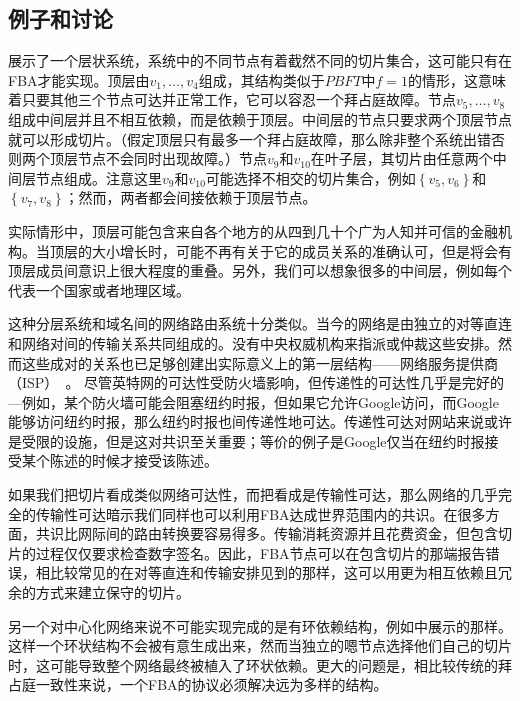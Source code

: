\subsection{例子和讨论}
展示了一个层状系统，系统中的不同节点有着截然不同的切片集合，这可能只有在FBA才能实现。顶层由$v_1,\ldots,v_4$组成，其结构类似于$PBFT$中$f=1$的情形，这意味着只要其他三个节点可达并正常工作，它可以容忍一个拜占庭故障。节点$v_5,\ldots,v_8$组成中间层并且不相互依赖，而是依赖于顶层。中间层的节点只要求两个顶层节点就可以形成切片。（假定顶层只有最多一个拜占庭故障，那么除非整个系统出错否则两个顶层节点不会同时出现故障。）节点$v_9$和$v_10$在叶子层，其切片由任意两个中间层节点组成。注意这里$v_9$和$v_10$可能选择不相交的切片集合，例如$\left\{v_5,v_6\right\}$和$\left\{v_7,v_8\right\}$；然而，两者都会间接依赖于顶层节点。

实际情形中，顶层可能包含来自各个地方的从四到几十个广为人知并可信的金融机构。当顶层的大小增长时，可能不再有关于它的成员关系的准确认可，但是将会有顶层成员间意识上很大程度的重叠。另外，我们可以想象很多的中间层，例如每个代表一个国家或者地理区域。

这种分层系统和域名间的网络路由系统十分类似。当今的网络是由独立的对等直连和网络对间的传输关系共同组成的。没有中央权威机构来指派或仲裁这些安排。然而这些成对的关系也已足够创建出实际意义上的第一层结构——网络服务提供商（ISP）~\cite{peer_isp2010}。	尽管英特网的可达性受防火墙影响，但传递性的可达性几乎是完好的---例如，某个防火墙可能会阻塞纽约时报，但如果它允许Google访问，而Google能够访问纽约时报，那么纽约时报也间传递性地可达。传递性可达对网站来说或许是受限的设施，但是这对共识至关重要；等价的例子是Google仅当在纽约时报接受某个陈述的时候才接受该陈述。

如果我们把{\quorum}切片看成类似网络可达性，而把{\quorum}看成是传输性可达，那么网络的几乎完全的传输性可达暗示我们同样也可以利用FBA达成世界范围内的共识。在很多方面，共识比网际间的路由转换要容易得多。传输消耗资源并且花费资金，但包含切片的过程仅仅要求检查数字签名。因此，FBA节点可以在包含切片的那端报告错误，相比较常见的在对等直连和传输安排见到的那样，这可以用更为相互依赖且冗余的方式来建立保守的切片。

另一个对中心化网络来说不可能实现完成的是有环依赖结构，例如中展示的那样。这样一个环状结构不会被有意生成出来，然而当独立的嗯节点选择他们自己的切片时，这可能导致整个网络最终被植入了环状依赖。更大的问题是，相比较传统的拜占庭一致性来说，一个FBA的协议必须解决远为多样的{\quorum}结构。